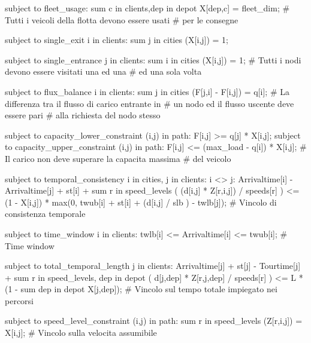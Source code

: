 		\begin{amplcode}
			subject to fleet_usage:
				sum {c in clients,dep in depot} X[dep,c] = fleet_dim;
								# Tutti i veicoli della flotta devono essere usati
								# per le consegne

			subject to single_exit {i in clients}:
				sum {j in cities} (X[i,j]) = 1; 
				
			subject to single_entrance {j in clients}:
				sum {i in cities} (X[i,j]) = 1;
								# Tutti i nodi devono essere visitati una ed una
								# ed una sola volta

			subject to flux_balance {i in clients}:
				sum {j in cities} (F[j,i] - F[i,j]) = q[i];
								# La differenza tra il flusso di carico entrante in 
								# un nodo ed il flusso uscente deve essere pari 
								# alla richiesta del nodo stesso

			subject to capacity_lower_constraint {(i,j) in path}:
				F[i,j] >= q[j] * X[i,j];
			subject to capacity_upper_constraint {(i,j) in path}:
				F[i,j] <= (max_load - q[i]) * X[i,j];
								# Il carico non deve superare la capacita massima
								# del veicolo

			subject to temporal_consistency {i in cities, j in clients: i <> j}:
				Arrivaltime[i] - Arrivaltime[j] + st[i] +
				sum {r in speed_levels} (
					(d[i,j] * Z[r,i,j]) / speeds[r]	
				) <= (1 - X[i,j]) * max(0, twub[i] + st[i] + (d[i,j] / slb ) - twlb[j]);
								# Vincolo di consistenza temporale
									
			subject to time_window {i in clients}:
				twlb[i] <= Arrivaltime[i] <= twub[i];
								# Time window

			subject to total_temporal_length {j in clients}:
				Arrivaltime[j] + st[j] - Tourtime[j] + 
				sum {r in speed_levels, dep in depot} (
					d[j,dep] * Z[r,j,dep] / speeds[r]
				) <= L * (1 - sum {dep in depot} X[j,dep]);
								# Vincolo sul tempo totale impiegato nei percorsi

			subject to speed_level_constraint {(i,j) in path}:
				sum {r in speed_levels} (Z[r,i,j]) = X[i,j];
								# Vincolo sulla velocita assumibile
		\end{amplcode}

